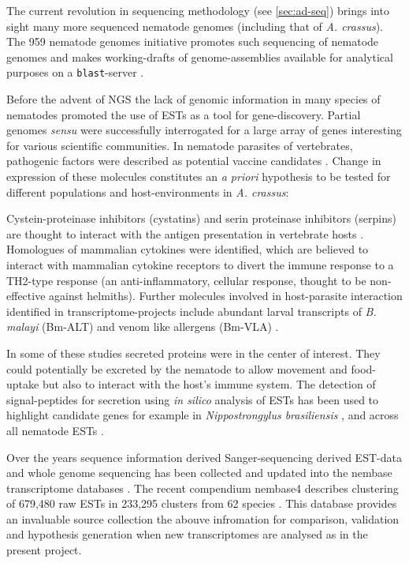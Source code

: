 The current revolution in sequencing methodology (see
\ref{sec:ad-seq}) brings into sight many more sequenced nematode
genomes (including that of \textit{A. crassus}). The 959 nematode
genomes initiative promotes such sequencing of nematode genomes and
makes working-drafts of genome-assemblies available for analytical
purposes on a \texttt{blast}-server \cite{pmid22058131}.

Before the advent of NGS the lack of genomic information in many
species of nematodes promoted the use of ESTs as a tool for
gene-discovery. Partial genomes \textit{sensu}
\cite{parkinson_partigene--constructing_2004} were successfully
interrogated for a large array of genes interesting for various
scientific communities. In nematode parasites of vertebrates,
pathogenic factors were described as potential vaccine candidates
\cite{pmid11406138}. Change in expression of these molecules
constitutes an \textit{a priori} hypothesis to be tested for different
populations and host-environments in \textit{A. crassus}:

Cystein-proteinase inhibitors (cystatins) and serin proteinase
inhibitors (serpins) are thought to interact with the antigen
presentation in vertebrate hosts \cite{pmid11406138}. Homologues of
mammalian cytokines were identified, which are believed to interact
with mammalian cytokine receptors to divert the immune response to a
TH2-type response \cite{maizels_helminth_2004} (an anti-inflammatory,
cellular response, thought to be non-effective against
helmiths). Further molecules involved in host-parasite interaction
identified in transcriptome-projects include abundant larval
transcripts of \textit{B. malayi} (Bm-ALT)
\cite{gomez-escobar_abundant_2002} and venom like allergens (Bm-VLA)
\cite{pmid11704277}.

In some of these studies secreted proteins were in the center of
interest. They could potentially be excreted by the nematode to allow
movement and food-uptake but also to interact with the host's immune
system. The detection of signal-peptides for secretion using
\textit{in silico} analysis of ESTs has been used to highlight
candidate genes for example in \textit{Nippostrongylus brasiliensis}
\cite{harcus_signal_2004}, and across all nematode ESTs
\cite{nagaraj_needles_2008}.

Over the years sequence information derived Sanger-sequencing derived
EST-data and whole genome sequencing has been collected and updated
into the nembase transcriptome databases
\cite{parkinson_nembase:resource_2004,wasmuth_extent_2008}. The recent
compendium nembase4 describes clustering of 679,480 raw ESTs in
233,295 clusters from 62 species \cite{pmid21550347}. This database
provides an invaluable source collection the abouve infromation for
comparison, validation and hypothesis generation when new
transcriptomes are analysed as in the present project.

